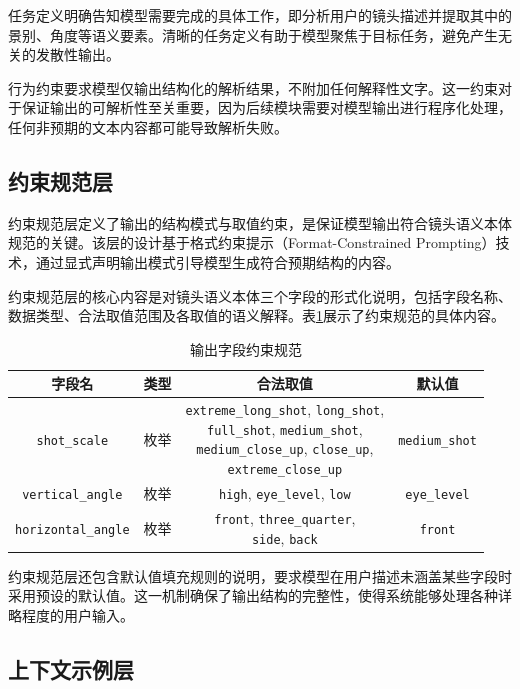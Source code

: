 任务定义明确告知模型需要完成的具体工作，即分析用户的镜头描述并提取其中的景别、角度等语义要素。清晰的任务定义有助于模型聚焦于目标任务，避免产生无关的发散性输出。

行为约束要求模型仅输出结构化的解析结果，不附加任何解释性文字。这一约束对于保证输出的可解析性至关重要，因为后续模块需要对模型输出进行程序化处理，任何非预期的文本内容都可能导致解析失败。

\subsection{约束规范层}

约束规范层定义了输出的结构模式与取值约束，是保证模型输出符合镜头语义本体规范的关键。该层的设计基于格式约束提示（Format-Constrained Prompting）技术\cite{geng2025jsonschemabench}，通过显式声明输出模式引导模型生成符合预期结构的内容。

约束规范层的核心内容是对镜头语义本体三个字段的形式化说明，包括字段名称、数据类型、合法取值范围及各取值的语义解释。表\ref{tab:output_constraint}展示了约束规范的具体内容。

\begin{table}[htbp]
\centering
\caption{输出字段约束规范}
\label{tab:output_constraint}
\begin{tabular}{cccc}
\toprule
字段名 & 类型 & 合法取值 & 默认值 \\
\midrule
\texttt{shot\_scale} & 枚举 & \makecell[c]{\texttt{extreme\_long\_shot}, \texttt{long\_shot}, \\ \texttt{full\_shot}, \texttt{medium\_shot}, \\ \texttt{medium\_close\_up}, \texttt{close\_up}, \\ \texttt{extreme\_close\_up}} & \texttt{medium\_shot} \\
\midrule
\texttt{vertical\_angle} & 枚举 & \texttt{high}, \texttt{eye\_level}, \texttt{low} & \texttt{eye\_level} \\
\midrule
\texttt{horizontal\_angle} & 枚举 & \makecell[c]{\texttt{front}, \texttt{three\_quarter}, \\ \texttt{side}, \texttt{back}} & \texttt{front} \\
\bottomrule
\end{tabular}
\end{table}

约束规范层还包含默认值填充规则的说明，要求模型在用户描述未涵盖某些字段时采用预设的默认值。这一机制确保了输出结构的完整性，使得系统能够处理各种详略程度的用户输入。

\subsection{上下文示例层}

